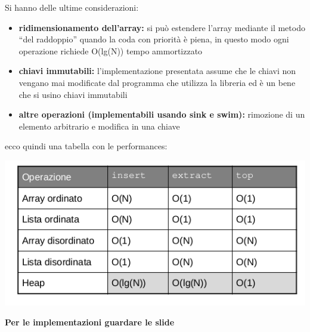 \documentclass[a4paper,12pt, oneside]{book}
\begin{document}
Si hanno delle ultime considerazioni:
\begin{itemize}
\item \textbf{ridimensionamento dell'array: }si può estendere l’array mediante il metodo “del raddoppio” quando
la coda con priorità è piena, in questo modo ogni operazione richiede O(lg(N)) tempo
ammortizzato
\item \textbf{chiavi immutabili:} l’implementazione presentata assume che le chiavi non vengano
mai modificate dal programma che utilizza la libreria ed è un bene che si usino chiavi immutabili
\item \textbf{altre operazioni (implementabili usando sink e swim):} rimozione di un elemento arbitrario e modifica in una chiave
\end{itemize}
\newpage
ecco quindi una tabella con le performances:
\begin{center}
\includegraphics[scale=2.5]{img/c14.png}
\end{center}
\textbf{Per le implementazioni guardare le slide}
\end{document}
